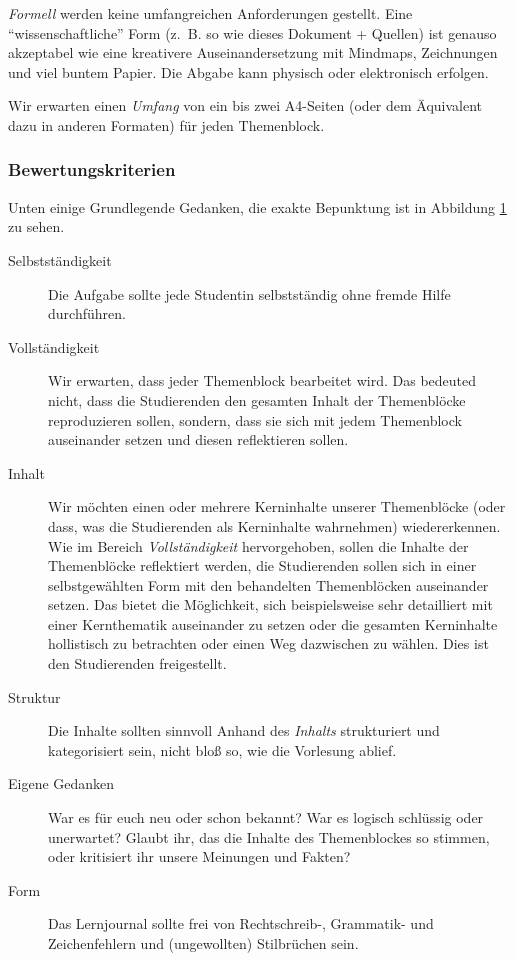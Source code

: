 \documentclass[DIV=15,headinclude=true]{scrartcl}
\begin{document}
\emph{Formell} werden keine umfangreichen Anforderungen gestellt. Eine
\enquote{wissenschaftliche} Form (z.~B. so wie dieses Dokument +
Quellen) ist genauso akzeptabel wie eine kreativere Auseinandersetzung
mit Mindmaps, Zeichnungen und viel buntem Papier. Die Abgabe kann
physisch oder elektronisch erfolgen.

Wir erwarten einen \emph{Umfang} von ein bis zwei A4-Seiten (oder dem
Äquivalent dazu in anderen Formaten) für jeden Themenblock.

\subsubsection{Bewertungskriterien}

Unten einige Grundlegende Gedanken, die exakte Bepunktung ist in
Abbildung \protect\hyperlink{abb:lernjournal}{1} zu sehen.

\begin{description}
	\item[Selbstständigkeit]
	      Die Aufgabe sollte jede Studentin selbstständig ohne fremde Hilfe
	      durchführen.
	\item[Vollständigkeit]
	      Wir erwarten, dass jeder Themenblock bearbeitet wird. Das bedeuted
	      nicht, dass die Studierenden den gesamten Inhalt der Themenblöcke
	      reproduzieren sollen, sondern, dass sie sich mit jedem Themenblock
	      auseinander setzen und diesen reflektieren sollen.
	\item[Inhalt]
	      Wir möchten einen oder mehrere Kerninhalte unserer Themenblöcke (oder
	      dass, was die Studierenden als Kerninhalte wahrnehmen) wiedererkennen.
	      Wie im Bereich \emph{Vollständigkeit} hervorgehoben, sollen die Inhalte
	      der Themenblöcke reflektiert werden, die Studierenden sollen sich in
	      einer selbstgewählten Form mit den behandelten Themenblöcken auseinander
	      setzen. Das bietet die Möglichkeit, sich beispielsweise sehr detailliert
	      mit einer Kernthematik auseinander zu setzen oder die gesamten
	      Kerninhalte hollistisch zu betrachten oder einen Weg dazwischen zu
	      wählen. Dies ist den Studierenden freigestellt.
	\item[Struktur]
	      Die Inhalte sollten sinnvoll Anhand des \emph{Inhalts} strukturiert und
	      kategorisiert sein, nicht bloß so, wie die Vorlesung ablief.
	\item[Eigene Gedanken]
	      War es für euch neu oder schon bekannt? War es logisch schlüssig oder
	      unerwartet? Glaubt ihr, das die Inhalte des Themenblockes so stimmen,
	      oder kritisiert ihr unsere Meinungen und Fakten?
	\item[Form]
	      Das Lernjournal sollte frei von Rechtschreib-, Grammatik- und
	      Zeichenfehlern und (ungewollten) Stilbrüchen sein.
\end{description}
\end{document}

